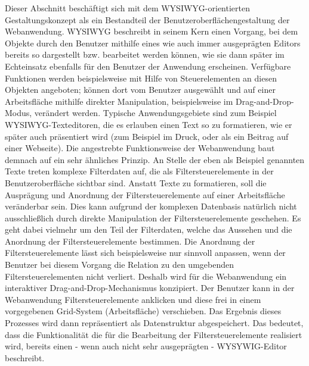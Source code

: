Dieser Abschnitt beschäftigt sich mit dem WYSIWYG-orientierten Gestaltungskonzept als ein Bestandteil der Benutzeroberflächengestaltung der Webanwendung. WYSIWYG beschreibt in seinem Kern einen Vorgang, bei dem Objekte durch den Benutzer mithilfe eines wie auch immer ausgeprägten Editors bereits so dargestellt bzw. bearbeitet werden können, wie sie dann später im \grqq{}Echteinsatz\grqq{} ebenfalls für den Benutzer der Anwendung erscheinen. Verfügbare Funktionen werden beispielsweise mit Hilfe von Steuerelementen an diesen Objekten angeboten; können dort vom Benutzer ausgewählt und auf einer Arbeitsfläche mithilfe direkter Manipulation, beispielsweise im Drag-and-Drop-Modus, verändert werden. Typische Anwendungsgebiete sind zum Beispiel WYSIWYG-Texteditoren, die es erlauben einen Text so zu formatieren, wie er später auch präsentiert wird (zum Beispiel im Druck, oder als ein Beitrag auf einer Webseite). Die angestrebte Funktionsweise der Webanwendung baut demnach auf ein sehr ähnliches Prinzip. An Stelle der eben als Beispiel genannten Texte treten komplexe Filterdaten auf, die als Filtersteuerelemente in der Benutzeroberfläche sichtbar sind. Anstatt Texte zu formatieren, soll die Ausprägung und Anordnung der Filtersteuerelemente auf einer Arbeitsfläche veränderbar sein. Dies kann aufgrund der komplexen Datenbasis natürlich nicht ausschließlich durch direkte Manipulation der Filtersteuerelemente geschehen. Es geht dabei vielmehr um den Teil der Filterdaten, welche das Aussehen und die Anordnung der Filtersteuerelemente bestimmen. Die Anordnung der Filtersteuerelemente lässt sich beispielsweise nur sinnvoll anpassen, wenn der Benutzer bei diesem Vorgang die Relation zu den umgebenden Filtersteuerelementen nicht verliert. Deshalb wird für die Webanwendung ein interaktiver Drag-and-Drop-Mechanismus konzipiert. Der Benutzer kann in der Webanwendung Filtersteuerelemente anklicken und diese frei in einem vorgegebenen Grid-System (Arbeitsfläche) verschieben. Das Ergebnis dieses Prozesses wird dann repräsentiert als Datenstruktur abgespeichert. Das bedeutet, dass die Funktionalität die für die Bearbeitung der Filtersteuerelemente realisiert wird, bereits einen - wenn auch nicht sehr ausgeprägten - WYSYWIG-Editor beschreibt.

